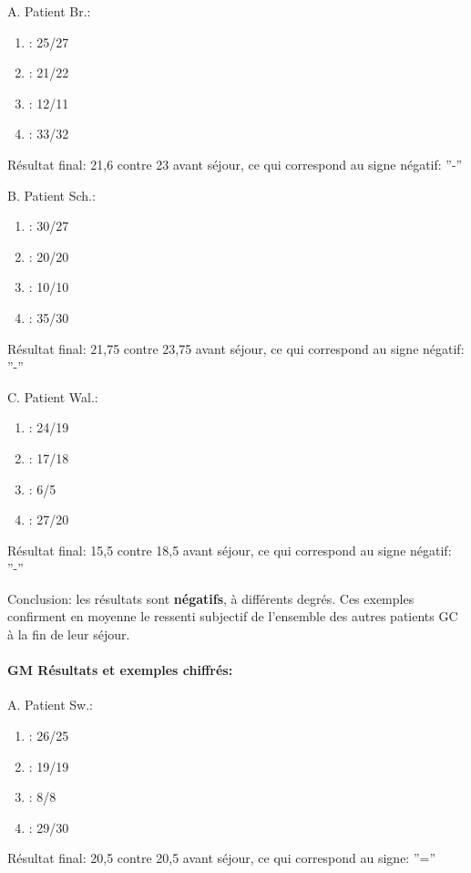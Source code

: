 \begin{enumerate}
A. Patient Br.:

	\begin{enumerate}
 		\item : 25/27 
 		\item : 21/22
 		\item : 12/11
 		\item : 33/32
                \end{enumerate}
                
        Résultat final: 21,6 contre 23 avant séjour,  ce qui
        correspond au signe négatif: ''-''

        
        B. Patient Sch.:

	\begin{enumerate}
 		\item : 30/27 
 		\item : 20/20
 		\item : 10/10
 		\item : 35/30
         \end{enumerate}
                Résultat final: 21,75 contre 23,75 avant séjour, ce qui
        correspond au signe négatif: ''-''

                
                C. Patient Wal.:
	\begin{enumerate}
 		\item : 24/19
 		\item : 17/18
 		\item : 6/5
 		\item : 27/20
 	\end{enumerate}
        Résultat final: 15,5 contre 18,5 avant séjour, ce qui
        correspond au signe négatif: ''-''

        Conclusion: les résultats sont \textbf{négatifs}, à différents degrés.
        Ces exemples confirment en moyenne 
        le ressenti subjectif de l'ensemble des autres patients GC à la fin de leur séjour.

        \paragraph{GM Résultats et exemples chiffrés:}


        
   A. Patient Sw.:
	\begin{enumerate}
 		\item : 26/25 
 		\item : 19/19
 		\item : 8/8
 		\item : 29/30
 	\end{enumerate}
        Résultat final: 20,5 contre 20,5 avant séjour, ce qui
        correspond au signe:  ''=''


\end{enumerate}
